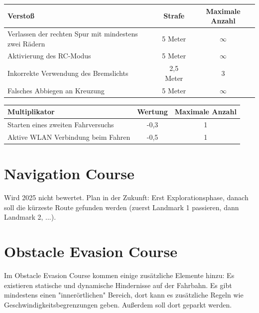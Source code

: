\documentclass[a4paper, 11pt,usegeometry]{scrartcl}
\begin{document}
\begin{table}[H]
\begin{tabular}{|p{}|c|c|}
\hline
\rowcolor[HTML]{CACACA} 
\textbf{Verstoß}                                  & \textbf{Strafe} & \textbf{Maximale Anzahl} \\ \hline
Verlassen der rechten Spur mit mindestens zwei Rädern & 5 Meter         & $\infty$                 \\ \hline
Aktivierung des RC-Modus                          & 5 Meter         & $\infty$                 \\ \hline
Inkorrekte Verwendung des Bremslichts             & 2,5 Meter       & 3                        \\ \hline
Falsches Abbiegen an Kreuzung                     & 5 Meter         & $\infty$                 \\ \hline
\end{tabular}
\end{table}
\begin{table}[H]
\begin{tabular}{|p{}|c|c|}
\hline
\rowcolor[HTML]{CACACA} 
\textbf{Multiplikator}             & \textbf{Wertung} & \textbf{Maximale Anzahl} \\ \hline
Starten eines zweiten Fahrversuchs & -0,3             & 1                  \\ \hline
Aktive WLAN Verbindung beim Fahren & -0,5             & 1                   \\ \hline
\end{tabular}
\end{table}

\section*{Navigation Course}
Wird 2025 nicht bewertet. Plan in der Zukunft: Erst Explorationsphase, danach soll die
kürzeste Route gefunden werden (zuerst Landmark 1 passieren, dann Landmark 2, ...).

\newpage
\section*{Obstacle Evasion Course}
Im Obstacle Evasion Course kommen einige zusätzliche Elemente hinzu: Es existieren
statische und dynamische Hindernisse auf der Fahrbahn.
Es gibt mindestens einen "innerörtlichen" Bereich, dort kann es zusätzliche 
Regeln wie Geschwindigkeitsbegrenzungen geben.
Außerdem soll dort geparkt werden.\\
\end{document}
